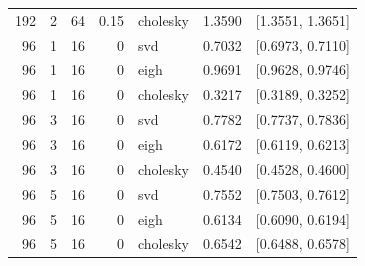 \begin{tabular}{rrrrlrr}
192 & 2 & 64 & 0.15 & cholesky & 1.3590 & [1.3551, 1.3651] \\
96 & 1 & 16 & 0 & svd & 0.7032 & [0.6973, 0.7110] \\
96 & 1 & 16 & 0 & eigh & 0.9691 & [0.9628, 0.9746] \\
96 & 1 & 16 & 0 & cholesky & 0.3217 & [0.3189, 0.3252] \\
96 & 3 & 16 & 0 & svd & 0.7782 & [0.7737, 0.7836] \\
96 & 3 & 16 & 0 & eigh & 0.6172 & [0.6119, 0.6213] \\
96 & 3 & 16 & 0 & cholesky & 0.4540 & [0.4528, 0.4600] \\
96 & 5 & 16 & 0 & svd & 0.7552 & [0.7503, 0.7612] \\
96 & 5 & 16 & 0 & eigh & 0.6134 & [0.6090, 0.6194] \\
96 & 5 & 16 & 0 & cholesky & 0.6542 & [0.6488, 0.6578] \\
\hline
\end{tabular}
